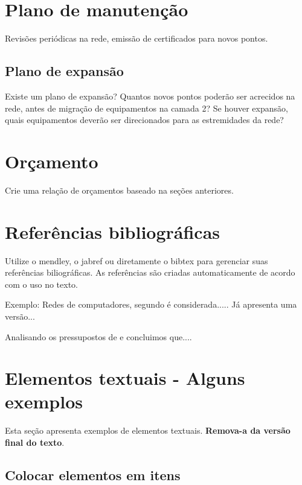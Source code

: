 \documentclass[	DIV=calc,%
							paper=a4,%
							fontsize=12pt,%
							onecolumn]{scrartcl}	 					%
\begin{document}
\section{Plano de manutenção}

Revisões periódicas na rede, emissão de certificados para novos pontos.

\subsection{Plano de expansão}
Existe um plano de expansão? Quantos novos pontos poderão ser acrecidos na rede, antes de migração de equipamentos na camada 2? Se houver expansão, quais equipamentos deverão ser direcionados para as estremidades da rede? 


\section{Orçamento}
Crie uma relação de orçamentos baseado na seções anteriores.

\section{Referências bibliográficas}
Utilize o mendley, o jabref ou diretamente o bibtex para gerenciar suas referências biliográficas. As referências são criadas automaticamente de acordo com o uso no texto.

Exemplo: Redes de computadores, segundo \cite{t2013} é considerada..... Já \cite{kurose2010} apresenta uma versão...

Analisando os pressupostos de \cite{ref3} e \cite{ref4} concluimos que....


\renewcommand\refname{} %

  


\section{Elementos textuais - Alguns exemplos}

Esta seção apresenta exemplos de elementos textuais. \textbf{Remova-a da versão final do texto}.


\subsection{Colocar elementos em itens}
\end{document}
